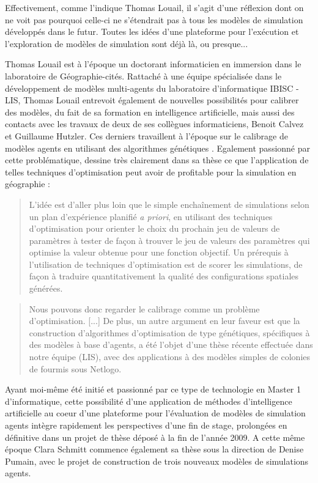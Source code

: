 Effectivement, comme l'indique Thomas Louail, il s'agit d'une réflexion dont on ne voit pas pourquoi celle-ci ne s'étendrait pas à tous les modèles de simulation développés dans le futur. Toutes les idées d'une plateforme pour l'exécution et l'exploration de modèles de simulation sont déjà là, ou presque...

Thomas Louail est à l'époque un doctorant informaticien en immersion dans le laboratoire de Géographie-cités. Rattaché à une équipe spécialisée dans le développement de modèles multi-agents du laboratoire d'informatique IBISC - LIS, Thomas Louail entrevoit également de nouvelles possibilités pour calibrer des modèles, du fait de sa formation en intelligence artificielle, mais aussi des contacts avec les travaux de deux de ses collègues informaticiens, Benoit Calvez et Guillaume Hutzler. Ces derniers travaillent à l'époque sur le calibrage de modèles agents en utilisant des algorithmes génétiques \autocites{Calvez2005,Calvez2007}. Egalement passionné par cette problématique, \textcite[139-141]{Louail2010} dessine très clairement dans sa thèse ce que l'application de telles techniques d'optimisation peut avoir de profitable pour la simulation en géographie :

\blockquote[{\cite[139-141]{Louail2010}}]{L’idée est d’aller plus loin que le simple enchaînement de simulations selon un plan d’expérience planifié \textit{a priori}, en utilisant des techniques d’optimisation pour orienter le choix du prochain jeu de valeurs de paramètres à tester de façon à trouver le jeu de valeurs des paramètres qui optimise la valeur obtenue pour une fonction objectif. Un prérequis à l’utilisation de techniques d’optimisation est de scorer les simulations, de façon à traduire quantitativement la qualité des configurations spatiales générées.}

\blockquote[{\cite[139-141]{Louail2010}}]{Nous pouvons donc regarder le calibrage comme un problème d’optimisation. [...] De plus, un autre argument en leur faveur est que la construction d’algorithmes d’optimisation de type génétiques, spécifiques à des modèles à base d’agents, a été l’objet d’une thèse récente effectuée dans notre équipe (LIS), avec des applications à des modèles simples de colonies de fourmis sous Netlogo.}

Ayant moi-même été initié et passionné par ce type de technologie en Master 1 d'informatique, cette possibilité d'une application de méthodes d'intelligence artificielle au coeur d'une plateforme pour l'évaluation de modèles de simulation agents intègre rapidement les perspectives d'une fin de stage, prolongées en définitive dans un projet de thèse déposé à la fin de l'année 2009. A cette même époque Clara Schmitt commence également sa thèse sous la direction de Denise Pumain, avec le projet de construction de trois nouveaux modèles de simulations agents.

